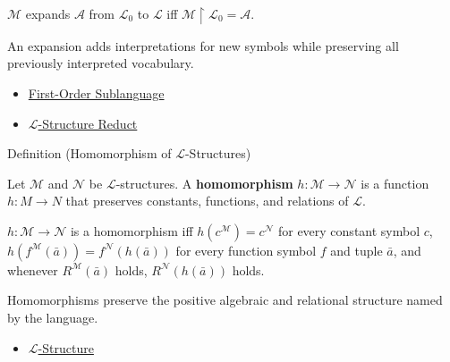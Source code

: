 \begin{remark*}
$\mathcal{M}$ expands $\mathcal{A}$ from $\mathcal{L}_0$ to $\mathcal{L}$ iff
$\mathcal{M}\!\upharpoonright\!\mathcal{L}_0=\mathcal{A}$.
\end{remark*}

\begin{remark*}[Interpretation]
An expansion adds interpretations for new symbols while preserving all
previously interpreted vocabulary.
\end{remark*}

\begin{dependencies}
\begin{itemize}
  \item \hyperref[def:first-order-sublanguage]{First-Order Sublanguage}
  \item \hyperref[def:l-structure-reduct]{$\mathcal{L}$-Structure Reduct}
\end{itemize}
\end{dependencies}

\begin{definitionbox}{Definition (Homomorphism of $\mathcal{L}$-Structures)}
\begin{definition}\label{def:l-structure-homomorphism}
Let $\mathcal{M}$ and $\mathcal{N}$ be $\mathcal{L}$-structures. A
\textbf{homomorphism} $h\colon\mathcal{M}\to\mathcal{N}$ is a function
$h\colon M\to N$ that preserves constants, functions, and relations of
$\mathcal{L}$.
\end{definition}
\end{definitionbox}

\begin{remark*}
$h\colon\mathcal{M}\to\mathcal{N}$ is a homomorphism iff
$h(c^{\mathcal{M}})=c^{\mathcal{N}}$ for every constant symbol $c$,
$h(f^{\mathcal{M}}(\bar a))=f^{\mathcal{N}}(h(\bar a))$ for every function
symbol $f$ and tuple $\bar a$, and whenever
$R^{\mathcal{M}}(\bar a)$ holds, $R^{\mathcal{N}}(h(\bar a))$ holds.
\end{remark*}

\begin{remark*}[Interpretation]
Homomorphisms preserve the positive algebraic and relational structure named
by the language.
\end{remark*}

\begin{dependencies}
\begin{itemize}
  \item \hyperref[def:l-structure]{$\mathcal{L}$-Structure}
\end{itemize}
\end{dependencies}

